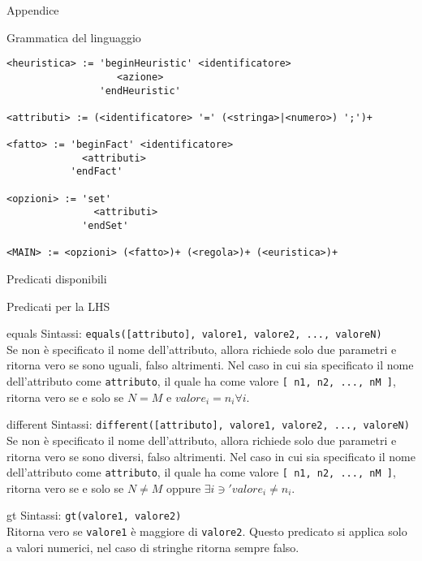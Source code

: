 \begin{chapter}{Appendice}
\begin{section}{Grammatica del linguaggio}
\begin{verbatim}
<heuristica> := 'beginHeuristic' <identificatore>
                   <azione>
                'endHeuristic'

<attributi> := (<identificatore> '=' (<stringa>|<numero>) ';')+

<fatto> := 'beginFact' <identificatore>
             <attributi>
           'endFact'

<opzioni> := 'set'
               <attributi>
             'endSet'

<MAIN> := <opzioni> (<fatto>)+ (<regola>)+ (<euristica>)+
\end{verbatim}

\end{section}

\begin{section}{Predicati disponibili}
\label{sec:predicates}

	\begin{subsection}{Predicati per la LHS}
	\label{sec:predicates-lhs}

		\begin{subsubsection}{equals}
		\label{sec:predicates-lhs-equals}
		Sintassi: \verb!equals([attributo], valore1, valore2, ..., valoreN)!\\
		Se non \`e specificato il nome dell'attributo, allora richiede solo due parametri e
		ritorna vero se sono uguali, falso altrimenti. Nel caso in cui sia specificato
		il nome dell'attributo come \verb,attributo,, il quale ha come valore
		\verb![ n1, n2, ..., nM ]!, ritorna vero se e solo se $ N = M $ e
		$ valore_{i} = n_{i} \forall i $.
		\end{subsubsection}

		\begin{subsubsection}{different}
		\label{sec:predicates-lhs-different}
		Sintassi: \verb!different([attributo], valore1, valore2, ..., valoreN)!\\
		Se non \`e specificato il nome dell'attributo, allora richiede solo due parametri e
		ritorna vero se sono diversi, falso altrimenti. Nel caso in cui sia specificato
		il nome dell'attributo come \verb,attributo,, il quale ha come valore
		\verb![ n1, n2, ..., nM ]!, ritorna vero se e solo se $ N \neq M $ oppure
		$ \exists i \ni' valore_{i} \neq n_{i} $.
		\end{subsubsection}

		\begin{subsubsection}{gt}
		\label{sec:predicates-lhs-gt}
		Sintassi: \verb!gt(valore1, valore2)!\\
		Ritorna vero se \verb,valore1, \`e maggiore di \verb,valore2,. Questo
		predicato si applica solo a valori numerici, nel caso di stringhe ritorna
		sempre falso.
		\end{subsubsection}


\end{subsection}
\end{section}
\end{chapter}
